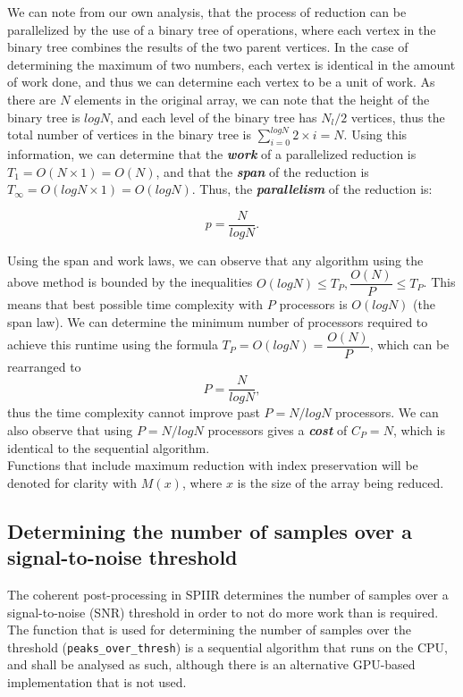 \documentclass{article}
\begin{document}
We can note from our own analysis, that the process of reduction can be parallelized by the use of a binary tree of operations, where each vertex in the binary tree combines the results of the two parent vertices.
In the case of determining the maximum of two numbers, each vertex is identical in the amount of work done, and thus we can determine each vertex to be a unit of work.
As there are \(N\) elements in the original array, we can note that the height of the binary tree is \(log N\), and each level of the binary tree has \(N_l/2\) vertices, thus the total number of vertices in the binary tree is \(\sum_{i=0}^{log N}{2\times{i}} = N\).
Using this information, we can determine that the \textit{\textbf{work}} of a parallelized reduction is \(T_1 = O(N\times1) = O(N)\), and that the \textit{\textbf{span}} of the reduction is \(T_\infty = O(log N \times {1}) = O(log N)\).
Thus, the \textit{\textbf{parallelism}} of the reduction is:

\[
    p = \dfrac{N}{log N}.
\]

Using the span and work laws, we can observe that any algorithm using the above method is bounded by the inequalities \(O(log N) \leq T_P, \dfrac{O(N)}{P} \leq T_P\).
This means that best possible time complexity with \(P\) processors is \(O(log N)\) (the span law).
We can determine the minimum number of processors required to achieve this runtime using the formula \(T_P = O(log N) = \dfrac{O(N)}{P}\), which can be rearranged to
\[
    P = \dfrac{N}{log N},
\]
thus the time complexity cannot improve past \(P = N/log N\) processors.
We can also observe that using \(P = N/log N\) processors gives a \textit{\textbf{cost}} of \(C_P = N\), which is identical to the sequential algorithm.
\\

Functions that include maximum reduction with index preservation will be denoted for clarity with \(M(x)\), where \(x\) is the size of the array being reduced.

\subsection{Determining the number of samples over a signal-to-noise threshold} \label{sec:peaks}

The coherent post-processing in SPIIR determines the number of samples over a signal-to-noise (SNR) threshold in order to not do more work than is required.
The function that is used for determining the number of samples over the threshold (\texttt{peaks\_over\_thresh}) is a sequential algorithm that runs on the CPU, and shall be analysed as such, although there is an alternative GPU-based implementation that is not used.
\end{document}
